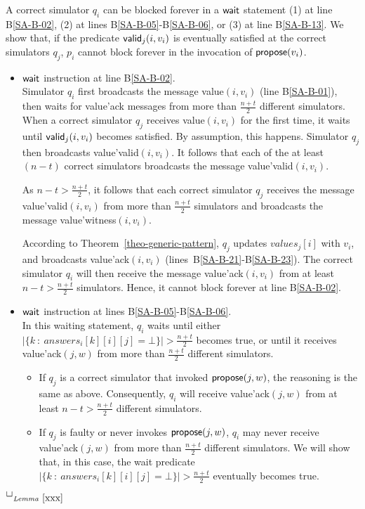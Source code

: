 \documentclass[11pt,letterpaper]{article}
\newlength {\afterproof}
\newcommand{\toto}{xxx}
\newenvironment{proofL}{\noindent{\bf Proof }}
{\hspace*{\fill}$\Box_{\mathit{Lemma}~\ref{\toto}}$\par\vspace{\afterproof}}
\begin{document}
\begin{proofL}
A correct simulator $q_i$ can be blocked forever in a ${\sf wait}$ statement
(1) at line B\ref{SA-B-02},  (2) at lines B\ref{SA-B-05}-B\ref{SA-B-06}, or
(3) at line B\ref{SA-B-13}. We show that, if the predicate
${\sf valid}_j(i,v_i)$  is eventually  satisfied at the correct simulators
$q_j$,  $p_i$ cannot block forever in the invocation of ${\sf propose}(v_i)$.

\begin{itemize}
\vspace{-0.2cm}
\item ${\sf wait}$ instruction at line B\ref{SA-B-02}. \\
Simulator $q_i$ first broadcasts the message {\sc value}$(i,v_i)$
(line B\ref{SA-B-01}), then waits for {\sc value'ack} messages from more than
$\frac{n+t}{2}$ different simulators.
When a correct simulator $q_j$ receives {\sc value}$(i,v_i)$ for the
first time, it waits until ${\sf valid}_j(i,v_i)$  becomes satisfied.
By assumption, this  happens.  Simulator $q_j$  then broadcasts
{\sc value'valid}$(i,v_i)$. It follows that each of the at least $(n-t)$
correct simulators  broadcasts the message {\sc value'valid}$(i,v_i)$.

As  $n-t>\frac{n+t}{2}$, it follows that each
correct simulator  $q_j$ receives the message {\sc value'valid}$(i,v_i)$
from more than $\frac{n+t}{2}$ simulators and broadcasts the message
{\sc value'witness}$(i,v_i)$.

 According to Theorem~\ref{theo-generic-pattern}, $q_j$ updates $values_j[i]$
 with  $v_i$, and broadcasts {\sc value'ack}$(i,v_i)$
(lines~B\ref{SA-B-21}-B\ref{SA-B-23}).
The correct simulator $q_i$ will then receive the message
{\sc value'ack}$(i,v_i)$ from at least  $n-t > \frac{n+t}{2}$
simulators. Hence, it cannot block forever at line  B\ref{SA-B-02}.

\vspace{-0.2cm}
\item ${\sf wait}$ instruction at lines B\ref{SA-B-05}-B\ref{SA-B-06}.\\
In this waiting statement, $q_i$ waits until
either $|\{k~:~answers_i[k][i][j]=\bot\}|>\frac{n+t}{2}$ becomes true, or
until it receives {\sc value'ack}$(j,w)$ from more than $\frac{n+t}{2}$
different simulators.
\vspace{-0.3cm}
\begin{itemize}
\item
If $q_j$ is a correct simulator that  invoked ${\sf propose}(j,w)$,
the reasoning is the same as above. Consequently, $q_i$ will receive
{\sc value'ack}$(j,w)$ from at least $n-t>\frac{n+t}{2}$ different
simulators.
\vspace{-0.1cm}
\item
If $q_j$ is faulty or never invokes ${\sf propose}(j,w)$, $q_i$ may never
receive {\sc value'ack}$(j,w)$ from more than $\frac{n+t}{2}$ different
simulators. We will show that, in this case, the wait predicate
$|\{k~:~answers_i[k][i][j]=\bot\}|>\frac{n+t}{2}$  eventually becomes true.
\end{itemize}


\end{itemize}
\end{proofL}
\end{document}
